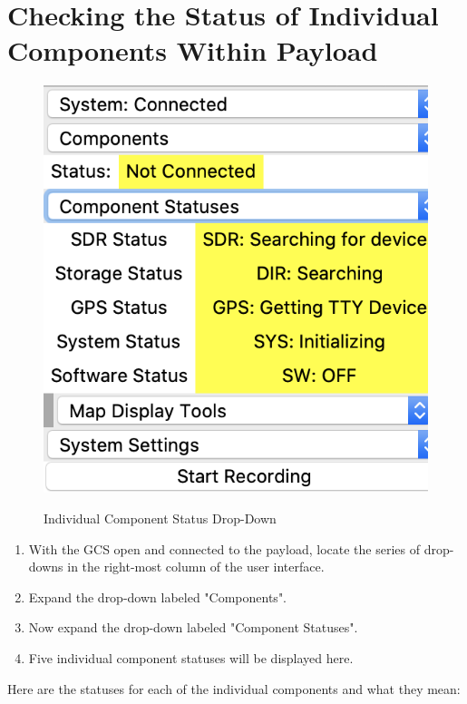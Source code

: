 \documentclass{report}
\begin{document}
		\section{Checking the Status of Individual Components Within Payload}
			\begin{figure}[htb]
				\centering
				\caption{Individual Component Status Drop-Down}
				\includegraphics[scale=0.5]{ind_comp_statuses_dd.jpg}
				\label{fig:ind_comp_statuses_dd}
			\end{figure}
			\begin{enumerate}
				\item With the GCS open and connected to the payload, locate the series of drop-downs in the right-most column of the user interface.
				\item Expand the drop-down labeled "Components".
				\item Now expand the drop-down labeled "Component Statuses".
				\item Five individual component statuses will be displayed here.
			\end{enumerate}
			Here are the statuses for each of the individual components and what they mean: \\
			
\end{document}
